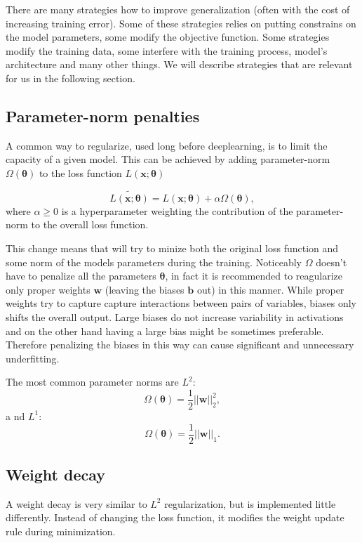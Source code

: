 There are many strategies how to improve generalization (often with the cost of increasing training error). Some of these strategies relies on putting constrains on the model parameters, some modify the objective function. Some strategies modify the training data, some interfere with the training process, model's architecture and many other things. We will describe strategies that are relevant for us in the following section.

\subsection{Parameter-norm penalties}
A common way to regularize, used long before deeplearning, is to limit the capacity of a given model. This can be achieved by adding parameter-norm $\Omega(\bm{\theta})$ to the loss function $L(\bm{x}; \bm{\theta})$

\begin{equation}
	\label{eq:loss-parameter-norm}
	\tilde{L(\bm{x}; \bm{\theta})} = L(\bm{x}; \bm{\theta}) + \alpha \Omega(\bm{\theta}),
\end{equation}
where $\alpha \geq 0$ is a hyperparameter weighting the contribution of the parameter-norm to the overall loss function.

This change means that will try to minize both the original loss function and some norm of the models parameters during the training. Noticeably $\Omega$ doesn't have to penalize all the parameters $\bm{\theta}$, in fact it is recommended to reagularize only proper weights $\bm{w}$ (leaving the biases $\bm{b}$ out) in this manner. While proper weights try to capture capture interactions between pairs of variables, biases only shifts the overall output. Large biases do not increase variability in activations and on the other hand having a large bias might be sometimes preferable. Therefore penalizing the biases in this way can cause significant and unnecessary underfitting.


The most common parameter norms are $L^2$:
\begin{equation}
 	\label{eq:l2-regularization}
 	\Omega(\bm{\theta}) = \dfrac{1}{2} ||\bm{w}||_2^2,
\end{equation} a
nd $L^1$:
\begin{equation}
	\label{eq:l1-regularization}
	\Omega(\bm{\theta}) = \dfrac{1}{2} ||\bm{w}||_1.
\end{equation} 


\subsection{Weight decay}
A weight decay is very similar to $L^2$ regularization, but is implemented little differently. Instead of changing the loss function, it modifies the weight update rule during minimization. 


